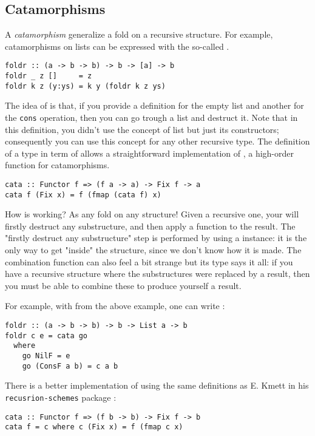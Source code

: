 \subsection{Catamorphisms}
A \emph{catamorphism} generalize a fold on a recursive structure. For example, catamorphisms on lists can be expressed with the so-called .
\begin{verbatim}
foldr :: (a -> b -> b) -> b -> [a] -> b
foldr _ z []     = z
foldr k z (y:ys) = k y (foldr k z ys)
\end{verbatim}
The idea of  is that, if you provide a definition for the empty list and another for the \verb|cons| operation, then you can go trough a list and destruct it. Note that in this definition, you didn't use the concept of list but just its constructors; consequently you can use this concept for any other recursive type. The definition of a type in term of  allows a straightforward implementation of , a high-order function for catamorphisms.

\begin{verbatim}
cata :: Functor f => (f a -> a) -> Fix f -> a
cata f (Fix x) = f (fmap (cata f) x)
\end{verbatim}
\noindent How  is working? As any fold on any structure! Given a recursive one, your will firstly destruct any substructure, and then apply a function to the result. The "firstly destruct any substructure" step is performed by using a  instance: it is the only way to get "inside" the structure, since we don't know how it is made. The combination function can also feel a bit strange but its type says it all: if you have a recursive structure where the substructures were replaced by a result, then you must be able to combine these to produce yourself a result.

For example, with  from the above example, one can write :
\begin{verbatim}
foldr :: (a -> b -> b) -> b -> List a -> b
foldr c e = cata go
  where
    go NilF = e
    go (ConsF a b) = c a b
\end{verbatim}

\noindent There is a better implementation of  using the same definitions as E. Kmett in his \verb|recusrion-schemes| package \cite{ekmett:eschems}:

\begin{verbatim}
cata :: Functor f => (f b -> b) -> Fix f -> b
cata f = c where c (Fix x) = f (fmap c x)
\end{verbatim}

